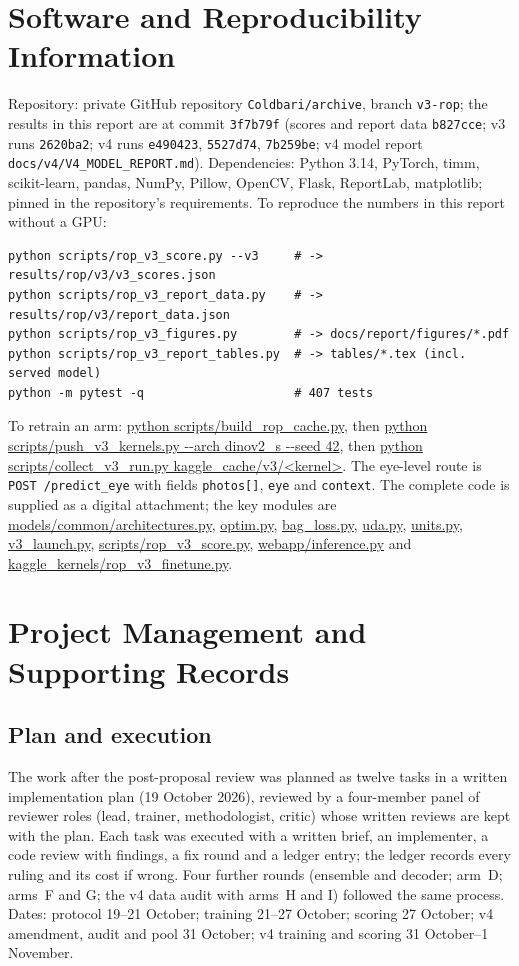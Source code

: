 \chapter{Software and Reproducibility Information}\label{app:software}
Repository: private GitHub repository \texttt{Coldbari/archive}, branch \texttt{v3-rop}; the results in this report are at commit \texttt{3f7b79f} (scores and report data \texttt{b827cce}; v3 runs \texttt{2620ba2}; v4 runs \texttt{e490423}, \texttt{5527d74}, \texttt{7b259be}; v4 model report \texttt{docs/v4/V4\_MODEL\_REPORT.md}). Dependencies: Python 3.14, PyTorch, timm, scikit-learn, pandas, NumPy, Pillow, OpenCV, Flask, ReportLab, matplotlib; pinned in the repository's requirements. To reproduce the numbers in this report without a GPU:
\begin{verbatim}
python scripts/rop_v3_score.py --v3     # -> results/rop/v3/v3_scores.json
python scripts/rop_v3_report_data.py    # -> results/rop/v3/report_data.json
python scripts/rop_v3_figures.py        # -> docs/report/figures/*.pdf
python scripts/rop_v3_report_tables.py  # -> tables/*.tex (incl. served model)
python -m pytest -q                     # 407 tests
\end{verbatim}
To retrain an arm: \url{python scripts/build_rop_cache.py}, then \url{python scripts/push_v3_kernels.py --arch dinov2_s --seed 42}, then \url{python scripts/collect_v3_run.py kaggle_cache/v3/<kernel>}. The eye-level route is \texttt{POST /predict\_eye} with fields \texttt{photos[]}, \texttt{eye} and \texttt{context}. The complete code is supplied as a digital attachment; the key modules are \url{models/common/architectures.py}, \url{optim.py}, \url{bag_loss.py}, \url{uda.py}, \url{units.py}, \url{v3_launch.py}, \url{scripts/rop_v3_score.py}, \url{webapp/inference.py} and \url{kaggle_kernels/rop_v3_finetune.py}.

\chapter{Project Management and Supporting Records}\label{app:management}
\section*{Plan and execution}
The work after the post-proposal review was planned as twelve tasks in a written implementation plan (19 October 2026), reviewed by a four-member panel of reviewer roles (lead, trainer, methodologist, critic) whose written reviews are kept with the plan. Each task was executed with a written brief, an implementer, a code review with findings, a fix round and a ledger entry; the ledger records every ruling and its cost if wrong. Four further rounds (ensemble and decoder; arm~D; arms~F and G; the v4 data audit with arms~H and I) followed the same process. Dates: protocol 19--21 October; training 21--27 October; scoring 27 October; v4 amendment, audit and pool 31 October; v4 training and scoring 31 October--1 November.
